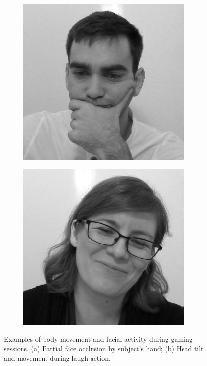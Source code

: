 \begin{figure}
\centering
  \begin{subfigure}[b]{0.5\textwidth}
    \includegraphics[width=0.95\textwidth]{Content/figures/face-occlusion}
    \caption{}
    \label{fig:face-occlusion}
  \end{subfigure}%
  \begin{subfigure}[b]{0.5\textwidth}
    \centering
    \includegraphics[width=0.95\textwidth]{Content/figures/head-tilt}
    \caption{}
    \label{fig:head-tilt}
  \end{subfigure}
  \caption{Examples of body movement and facial activity during gaming sessions. (a) Partial face occlusion by subject's hand; (b) Head tilt and movement during laugh action.}
  \label{fig:face-variation}
\end{figure}


